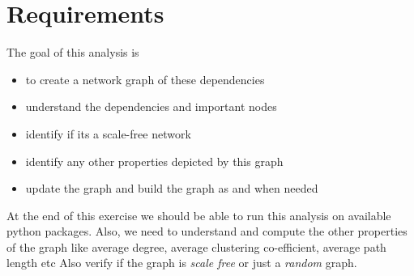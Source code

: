 \section{Requirements} \label{req}
The goal of this analysis is
 \begin{itemize}
 \item to create a network graph of these dependencies
 \item understand the dependencies and important nodes
 \item identify if its a scale-free network
 \item identify any other properties depicted by this graph
 \item update the graph and build the graph as and when needed
 \end{itemize}
 At the end of this exercise we should be able to run this
 analysis on available python \cite{www-python-org} packages.
 Also, we need to understand and compute the other properties of the graph
 like average degree, average clustering co-efficient, average path length etc
 Also verify if the graph is \textit{scale free} or just a \textit{random} graph.  
